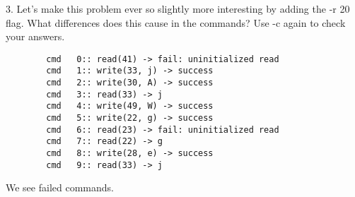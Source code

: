 \documentclass{article}
\begin{document}
    3. Let’s make this problem ever so slightly more interesting by adding
    the -r 20 flag. What differences does this cause in the commands?
    Use -c again to check your answers.
    \scriptsize {
        \begin{verbatim}
        cmd   0:: read(41) -> fail: uninitialized read
        cmd   1:: write(33, j) -> success
        cmd   2:: write(30, A) -> success
        cmd   3:: read(33) -> j
        cmd   4:: write(49, W) -> success
        cmd   5:: write(22, g) -> success
        cmd   6:: read(23) -> fail: uninitialized read
        cmd   7:: read(22) -> g
        cmd   8:: write(28, e) -> success
        cmd   9:: read(33) -> j
        \end{verbatim}
    }
    We see failed commands.\newline
\end{document}
